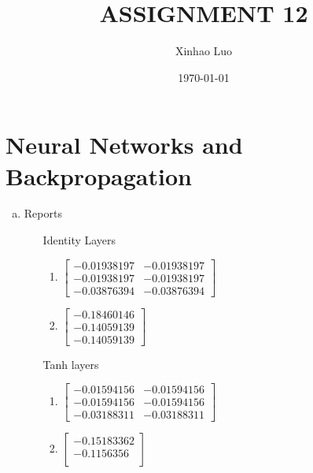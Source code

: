 \documentclass{article}
\title{\bf \Large ASSIGNMENT 12}
\author{Xinhao Luo}
\date{\today}
\def\math#1{$#1$}
\begin{document}
\maketitle
\medskip

\section{Neural Networks and Backpropagation}

\begin{enumerate}[a)]
    \item Reports
        \begin{itemize}
            \item [Identity] Layers
                \begin{enumerate}[1)]
                    \item \math{\begin{bmatrix}
                            -0.01938197 & -0.01938197 \\
                            -0.01938197 & -0.01938197 \\
                            -0.03876394 & -0.03876394 
                        \end{bmatrix}}
                    \item \math{\begin{bmatrix}
                            -0.18460146 \\
                            -0.14059139 \\
                            -0.14059139 
                        \end{bmatrix}}
                \end{enumerate}
            \item [Tanh] layers
                \begin{enumerate}[1)]
                    \item \math{\begin{bmatrix}
                            -0.01594156 & -0.01594156 \\
                            -0.01594156 & -0.01594156 \\
                            -0.03188311 & -0.03188311 
                            \end{bmatrix}}
                    \item \math{\begin{bmatrix}
                            -0.15183362 \\
                            -0.1156356 \\

\end{bmatrix}}
\end{enumerate}
\end{itemize}
\end{enumerate}
\end{document}
